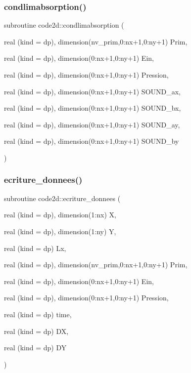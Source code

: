 \mbox{\label{main2Dv1_8f90_a4fa8d6d2b6084471f67e67e44694e3a7}} 
\subsubsection{\texorpdfstring{condlimabsorption()}{condlimabsorption()}}
{\footnotesize\ttfamily subroutine code2d\+::condlimabsorption (\begin{DoxyParamCaption}\item[{real (kind = dp), dimension(nv\+\_\+prim,0\+:nx+1,0\+:ny+1)}]{Prim,  }\item[{real (kind = dp), dimension(0\+:nx+1,0\+:ny+1)}]{Ein,  }\item[{real (kind = dp), dimension(0\+:nx+1,0\+:ny+1)}]{Pression,  }\item[{real (kind = dp), dimension(0\+:nx+1,0\+:ny+1)}]{S\+O\+U\+N\+D\+\_\+ax,  }\item[{real (kind = dp), dimension(0\+:nx+1,0\+:ny+1)}]{S\+O\+U\+N\+D\+\_\+bx,  }\item[{real (kind = dp), dimension(0\+:nx+1,0\+:ny+1)}]{S\+O\+U\+N\+D\+\_\+ay,  }\item[{real (kind = dp), dimension(0\+:nx+1,0\+:ny+1)}]{S\+O\+U\+N\+D\+\_\+by }\end{DoxyParamCaption})}

\mbox{\label{main2Dv1_8f90_aff02bfa8466e376e08fed7a99aae4039}} 
\subsubsection{\texorpdfstring{ecriture\+\_\+donnees()}{ecriture\_donnees()}}
{\footnotesize\ttfamily subroutine code2d\+::ecriture\+\_\+donnees (\begin{DoxyParamCaption}\item[{real (kind = dp), dimension(1\+:nx)}]{X,  }\item[{real (kind = dp), dimension(1\+:ny)}]{Y,  }\item[{real (kind = dp)}]{Lx,  }\item[{real (kind = dp), dimension(nv\+\_\+prim,0\+:nx+1,0\+:ny+1)}]{Prim,  }\item[{real (kind = dp), dimension(0\+:nx+1,0\+:ny+1)}]{Ein,  }\item[{real (kind = dp), dimension(0\+:nx+1,0\+:ny+1)}]{Pression,  }\item[{real (kind = dp)}]{time,  }\item[{real (kind = dp)}]{DX,  }\item[{real (kind = dp)}]{DY }\end{DoxyParamCaption})}

